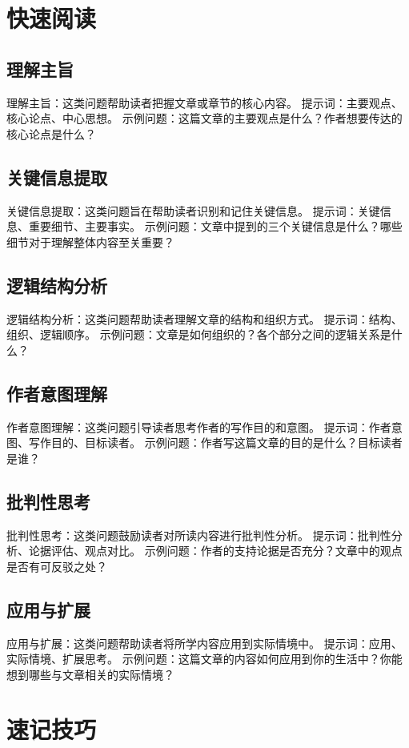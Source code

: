 \documentclass[12pt]{book}
\begin{document}
\section{快速阅读}
\subsection{理解主旨}
理解主旨：这类问题帮助读者把握文章或章节的核心内容。
提示词：主要观点、核心论点、中心思想。
示例问题：这篇文章的主要观点是什么？作者想要传达的核心论点是什么？

\subsection{关键信息提取}
关键信息提取：这类问题旨在帮助读者识别和记住关键信息。
提示词：关键信息、重要细节、主要事实。
示例问题：文章中提到的三个关键信息是什么？哪些细节对于理解整体内容至关重要？

\subsection{逻辑结构分析}
逻辑结构分析：这类问题帮助读者理解文章的结构和组织方式。
提示词：结构、组织、逻辑顺序。
示例问题：文章是如何组织的？各个部分之间的逻辑关系是什么？

\subsection{作者意图理解}
作者意图理解：这类问题引导读者思考作者的写作目的和意图。
提示词：作者意图、写作目的、目标读者。
示例问题：作者写这篇文章的目的是什么？目标读者是谁？

\subsection{批判性思考}
批判性思考：这类问题鼓励读者对所读内容进行批判性分析。
提示词：批判性分析、论据评估、观点对比。
示例问题：作者的支持论据是否充分？文章中的观点是否有可反驳之处？

\subsection{应用与扩展}
应用与扩展：这类问题帮助读者将所学内容应用到实际情境中。
提示词：应用、实际情境、扩展思考。
示例问题：这篇文章的内容如何应用到你的生活中？你能想到哪些与文章相关的实际情境？

\section{速记技巧}
\end{document}

